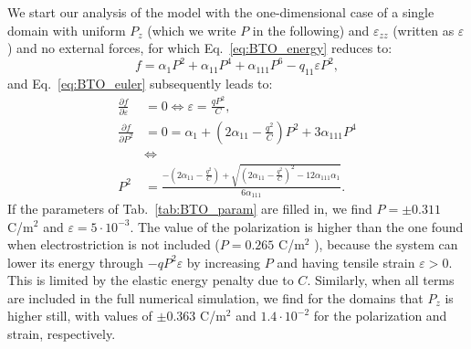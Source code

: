 We start our analysis of the model with the one-dimensional case of a single domain with uniform $P_z$ (which we write $P$ in the following) and $\varepsilon_{zz}$ (written as $\varepsilon$) and no external forces, for which Eq.~\ref{eq:BTO_energy} reduces to:
\begin{equation}
	f = \alpha_1 P^2 + \alpha_{11} P^4 + \alpha_{111} P^6 - q_{11} \varepsilon P^2,
\end{equation}
and Eq.~\eqref{eq:BTO_euler} subsequently leads to:  
\begin{align}
	\frac{\partial f}{\partial \varepsilon} &= 0 \Leftrightarrow \varepsilon = \frac{qP^2}{C}\label{eq:BTO_e0},\\
	\frac{\partial f}{\partial P^2} &= 0 = \alpha_1 + (2 \alpha_{11} - \frac{q^2}{C})P^2 + 3\alpha_{111}P^4 \\
	& \Leftrightarrow \\
	P^2 &= \frac{-(2\alpha_{11} - \frac{q^2}{C}) + \sqrt{(2\alpha_{11}-\frac{q^2}{C})^2 - 12 \alpha_{111} \alpha_1}}{6\alpha_{111}}.
\end{align}
If the parameters of Tab.~\ref{tab:BTO_param} are filled in, we find $P = \pm 0.311$ C/m$^2$ and $\varepsilon = 5 \cdot 10^{-3}$.
The value of the polarization is higher than the one found when electrostriction is not included ($P = 0.265$ C/m$^2$ \cite{Marton2010}), because the system can lower its energy through $-qP^2\varepsilon$ by increasing $P$ and having tensile strain $\varepsilon > 0$. This is limited by the elastic energy penalty due to $C$.
Similarly, when all terms are included in the full numerical simulation, we find for the domains that $P_z$ is higher still, with values of $\pm 0.363$ C/m$^2$ and $1.4 \cdot 10^{-2}$ for the polarization and strain, respectively.

